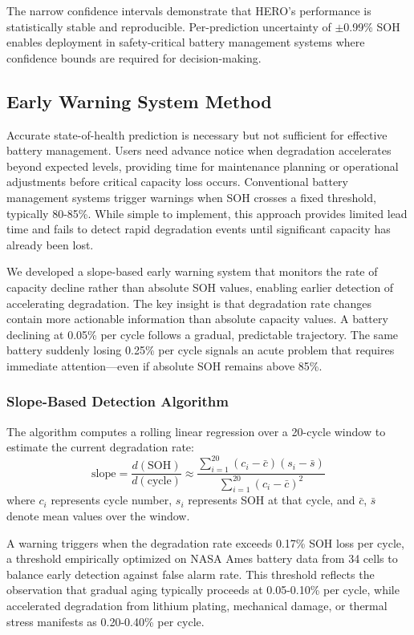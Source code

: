 \documentclass[5p,times,authoryear]{elsarticle}
\begin{document}
The narrow confidence intervals demonstrate that HERO's performance is statistically stable and reproducible. Per-prediction uncertainty of $\pm$0.99\% SOH enables deployment in safety-critical battery management systems where confidence bounds are required for decision-making.



\subsection{Early Warning System Method}


Accurate state-of-health prediction is necessary but not sufficient for effective battery management. Users need advance notice when degradation accelerates beyond expected levels, providing time for maintenance planning or operational adjustments before critical capacity loss occurs. Conventional battery management systems trigger warnings when SOH crosses a fixed threshold, typically 80-85\%. While simple to implement, this approach provides limited lead time and fails to detect rapid degradation events until significant capacity has already been lost.

We developed a slope-based early warning system that monitors the rate of capacity decline rather than absolute SOH values, enabling earlier detection of accelerating degradation. The key insight is that degradation rate changes contain more actionable information than absolute capacity values. A battery declining at 0.05\% per cycle follows a gradual, predictable trajectory. The same battery suddenly losing 0.25\% per cycle signals an acute problem that requires immediate attention---even if absolute SOH remains above 85\%.

\subsubsection{Slope-Based Detection Algorithm}

The algorithm computes a rolling linear regression over a 20-cycle window to estimate the current degradation rate:
\begin{equation}
\text{slope} = \frac{d(\text{SOH})}{d(\text{cycle})} \approx \frac{\sum_{i=1}^{20} (c_i - \bar{c})(s_i - \bar{s})}{\sum_{i=1}^{20} (c_i - \bar{c})^2}
\end{equation}
where $c_i$ represents cycle number, $s_i$ represents SOH at that cycle, and $\bar{c}$, $\bar{s}$ denote mean values over the window.

A warning triggers when the degradation rate exceeds 0.17\% SOH loss per cycle, a threshold empirically optimized on NASA Ames battery data from 34 cells to balance early detection against false alarm rate. This threshold reflects the observation that gradual aging typically proceeds at 0.05-0.10\% per cycle, while accelerated degradation from lithium plating, mechanical damage, or thermal stress manifests as 0.20-0.40\% per cycle.
\end{document}
